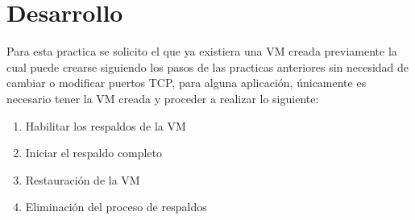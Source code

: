 \documentclass[10pt,executivepaper]{article}
\begin{document}
\begin{center}
	\par{}
\par{}
\par{}
\par\vspace{2cm}{
	Ultima fecha modificado: \today
}
\end{center}

\clearpage
\section{Desarrollo}
Para esta practica se solicito el que ya existiera una VM creada previamente la cual puede crearse siguiendo los pasos de las practicas anteriores sin necesidad de cambiar o modificar puertos TCP, para alguna aplicación, únicamente es necesario tener la VM creada y proceder a realizar lo siguiente:
\begin{enumerate}
  \item Habilitar los respaldos de la VM
  \item Iniciar el respaldo completo
  \item Restauración de la VM
  \item Eliminación del proceso de respaldos
\end{enumerate}
\end{document}
